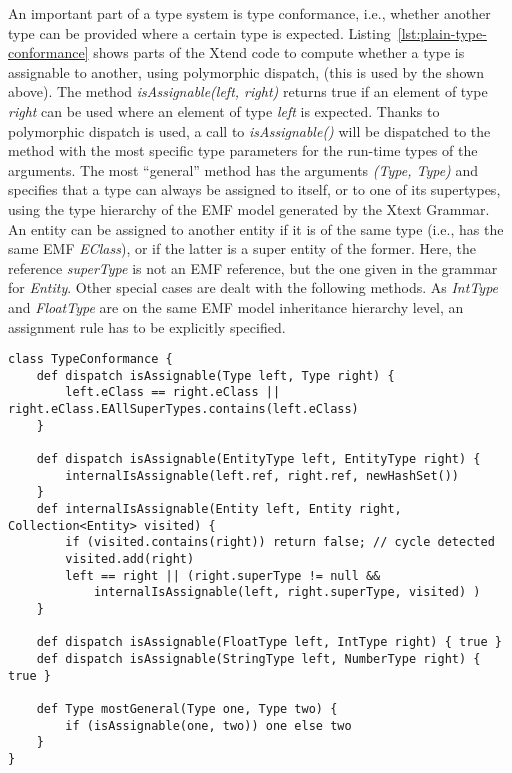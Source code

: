 An important part of a type system is type conformance, i.e., whether another
type can be provided where a certain type is expected.
Listing~\ref{lst:plain-type-conformance} shows parts of the Xtend code to
compute whether a type is assignable to another, using polymorphic dispatch, (this is used by
the  shown above).
The method
\emph{isAssignable(left, right)} returns true if an element of type \emph{right}
can be used where an element of type \emph{left} is expected.
Thanks to polymorphic dispatch is used, a call to \emph{isAssignable()} will be
dispatched to the method with the most specific type parameters for the run-time
types of the arguments. The most ``general'' method has the arguments
\emph{(Type, Type)} and specifies that a type can always be assigned to itself,
or to one of its supertypes, using the type hierarchy of the EMF model generated
by the Xtext Grammar.
An entity can be assigned to another entity if it is of the same type (i.e., has
the same EMF \emph{EClass}), or if the latter is a super entity of the former.
Here, the reference \emph{superType} is not an EMF reference, but the one given
in the grammar for \emph{Entity}. Other special cases are dealt with the
following methods. As \emph{IntType} and \emph{FloatType} are on the same EMF
model inheritance hierarchy level, an assignment rule has to be explicitly
specified.

\begin{lstlisting}[language=xtend,float=tb,label=lst:plain-type-conformance,caption=Type
conformance specification (Xtend code).] 
class TypeConformance {
	def dispatch isAssignable(Type left, Type right) {
		left.eClass == right.eClass || right.eClass.EAllSuperTypes.contains(left.eClass) 
	}

	def dispatch isAssignable(EntityType left, EntityType right) {
		internalIsAssignable(left.ref, right.ref, newHashSet())
	}
	def internalIsAssignable(Entity left, Entity right, Collection<Entity> visited) {
		if (visited.contains(right)) return false; // cycle detected
		visited.add(right)
		left == right || (right.superType != null && 
			internalIsAssignable(left, right.superType, visited) )
	}
	
	def dispatch isAssignable(FloatType left, IntType right) { true }
	def dispatch isAssignable(StringType left, NumberType right) { true }

	def Type mostGeneral(Type one, Type two) {
		if (isAssignable(one, two)) one else two
	}
}
\end{lstlisting}


